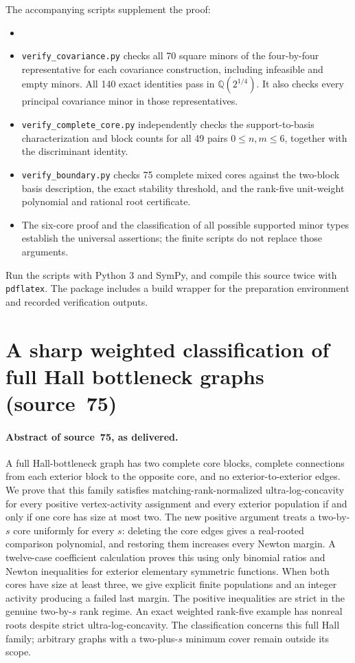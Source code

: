 \documentclass[11pt,a4paper]{article}
\theoremstyle{remark}\newtheorem{remark}[theorem]{Remark}
\newcommand{\mnote}[1]{[\textit{Merge note:} #1]}
\begin{document}
The accompanying scripts supplement the proof:
\begin{itemize}
\item \mnote{The scripts are shipped as \path{code/76-rank-four-verify_*.py} and their outputs as \path{data/76-rank-four-*_verification.json}; the build wrapper is not shipped.}
\item \texttt{verify\_covariance.py} checks all 70 square minors of the four-by-four representative for each covariance construction, including infeasible and empty minors. All 140 exact identities pass in $\mathbb Q(2^{1/4})$. It also checks every principal covariance minor in those representatives.
\item \texttt{verify\_complete\_core.py} independently checks the support-to-basis characterization and block counts for all 49 pairs $0\le n,m\le6$, together with the discriminant identity.
\item \texttt{verify\_boundary.py} checks 75 complete mixed cores against the two-block basis description, the exact stability threshold, and the rank-five unit-weight polynomial and rational root certificate.
\item The six-core proof and the classification of all possible supported minor types establish the universal assertions; the finite scripts do not replace those arguments.
\end{itemize}
Run the scripts with Python 3 and SymPy, and compile this source twice with \texttt{pdflatex}. The package includes a build wrapper for the preparation environment and recorded verification outputs.

\section{A sharp weighted classification of full Hall bottleneck graphs (source~75)}\label{mrn:src:75}
\paragraph{Abstract of source~75, as delivered.} A full Hall-bottleneck graph has two complete core blocks, complete connections from each exterior block to the opposite core, and no exterior-to-exterior edges. We prove that this family satisfies matching-rank-normalized ultra-log-concavity for every positive vertex-activity assignment and every exterior population if and only if one core has size at most two. The new positive argument treats a two-by-$s$ core uniformly for every $s$: deleting the core edges gives a real-rooted comparison polynomial, and restoring them increases every Newton margin. A twelve-case coefficient calculation proves this using only binomial ratios and Newton inequalities for exterior elementary symmetric functions. When both cores have size at least three, we give explicit finite populations and an integer activity producing a failed last margin. The positive inequalities are strict in the genuine two-by-$s$ rank regime. An exact weighted rank-five example has nonreal roots despite strict ultra-log-concavity. The classification concerns this full Hall family; arbitrary graphs with a two-plus-$s$ minimum cover remain outside its scope.
\end{document}
